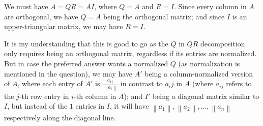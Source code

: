 \documentclass[11pt]{article}
\providecommand{\norm}[1]{\left\lVert #1 \right\rVert}
\begin{document}
We must have $A = QR = AI$, where $Q = A$ and $R = I$. Since every column in $A$ are orthogonal, we have $Q = A$ being the orthogonal matrix; and since $I$ is an upper-triangular matrix, we may have $R = I$.

It is my understanding that this is good to go as the $Q$ in $QR$ decomposition only requires being an orthogonal matrix, regardless if its entries are normalized. But in case the preferred answer wants a normalized $Q$ (as normalization is mentioned in the question), we may have $A'$ being a column-normalized version of $A$, where each entry of $A'$ is $\frac{a_{ij}}{\norm{a_i}}$ in contrast to $a_ij$ in $A$ (where $a_{ij}$ refers to the $j$-th row entry in $i$-th column in $A$); and $I'$ being a diagonal matrix similar to $I$, but instead of the $1$ entries in $I$, it will have $\norm{a_1}, \norm{a_2}, ..., \norm{a_n}$ respectively along the diagonal line.
\end{document}

